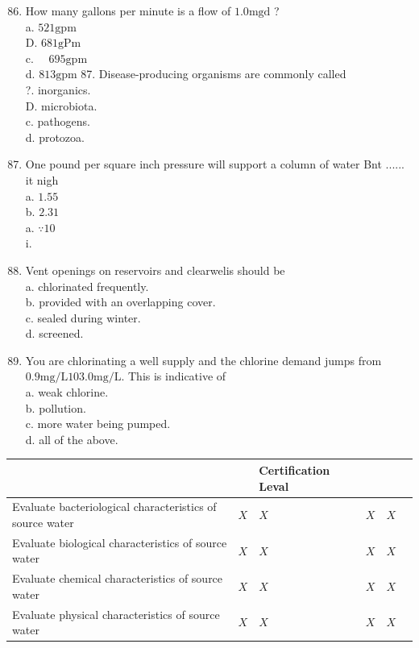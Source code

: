\documentclass[10pt]{article}
\begin{document}
\begin{enumerate}
  \setcounter{enumi}{85}
  \item How many gallons per minute is a flow of $1.0 \mathrm{mgd}$ ?\\
a. $521 \mathrm{gpm}$\\
D. $681 \mathrm{gPm}$\\
c. $\quad 695 \mathrm{gpm}$\\
d. $813 \mathrm{gpm}$ 87. Disease-producing organisms are commonly called\\
?. inorganics.\\
D. microbiota.\\
c. pathogens.\\
d. protozoa.

  \item One pound per square inch pressure will support a column of water Bnt ...... it nigh\\
a. $1.55$\\
b. $2.31$\\
a. $\because 10$\\
i.

  \item Vent openings on reservoirs and clearwelis should be\\
a. chlorinated frequently.\\
b. provided with an overlapping cover.\\
c. sealed during winter.\\
d. screened.

  \item You are chlorinating a well supply and the chlorine demand jumps from $0.9 \mathrm{mg} / \mathrm{L} 103.0 \mathrm{mg} / \mathrm{L}$. This is indicative of\\
a. weak chlorine.\\
b. pollution.\\
c. more water being pumped.\\
d. all of the above.

\end{enumerate}

\begin{tabular}{llllll}
\hline
 &  & Certification Leval &  &  \\
\hline
Evaluate bacteriological characteristics of source water & $X$ & $X$ & $X$ & $X$ \\
Evaluate biological characteristics of source water & $X$ & $X$ & $X$ & $X$ \\
Evaluate chemical characteristics of source water & $X$ & $X$ & $X$ & $X$ \\
Evaluate physical characteristics of source water & $X$ & $X$ & $X$ & $X$ \\
\hline
\end{tabular}
\end{document}
